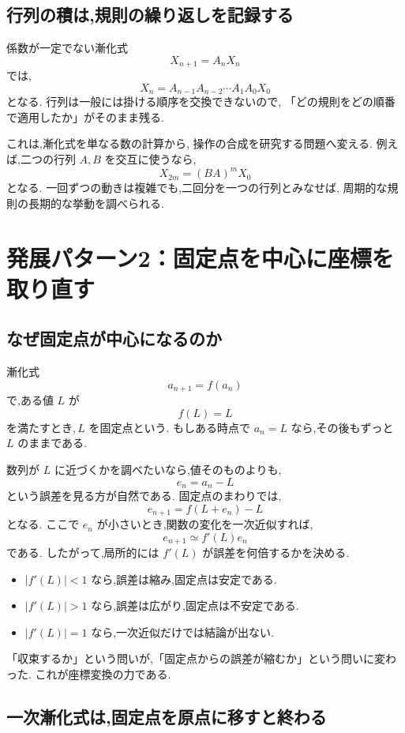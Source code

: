 \subsection{行列の積は,規則の繰り返しを記録する}

係数が一定でない漸化式
\[
  X_{n+1}=A_nX_n
\]
では,
\[
  X_n=A_{n-1}A_{n-2}\cdots A_1A_0X_0
\]
となる.
行列は一般には掛ける順序を交換できないので,
「どの規則をどの順番で適用したか」がそのまま残る.

これは,漸化式を単なる数の計算から,
操作の合成を研究する問題へ変える.
例えば,二つの行列 $A,B$ を交互に使うなら,
\[
  X_{2m}=(BA)^mX_0
\]
となる.
一回ずつの動きは複雑でも,二回分を一つの行列とみなせば,
周期的な規則の長期的な挙動を調べられる.

\section{発展パターン2：固定点を中心に座標を取り直す}

\subsection{なぜ固定点が中心になるのか}

漸化式
\[
  a_{n+1}=f(a_n)
\]
で,ある値 $L$ が
\[
  f(L)=L
\]
を満たすとき,\,$L$ を固定点という.
もしある時点で $a_n=L$ なら,その後もずっと $L$ のままである.

数列が $L$ に近づくかを調べたいなら,値そのものよりも,
\[
  e_n=a_n-L
\]
という誤差を見る方が自然である.
固定点のまわりでは,
\[
  e_{n+1}=f(L+e_n)-L
\]
となる.
ここで $e_n$ が小さいとき,関数の変化を一次近似すれば,
\[
  e_{n+1}\simeq f'(L)e_n
\]
である.
したがって,局所的には $f'(L)$ が誤差を何倍するかを決める.

\begin{itemize}
  \item $|f'(L)|<1$ なら,誤差は縮み,固定点は安定である.
  \item $|f'(L)|>1$ なら,誤差は広がり,固定点は不安定である.
  \item $|f'(L)|=1$ なら,一次近似だけでは結論が出ない.
\end{itemize}

「収束するか」という問いが,「固定点からの誤差が縮むか」という問いに変わった.
これが座標変換の力である.

\subsection{一次漸化式は,固定点を原点に移すと終わる}

